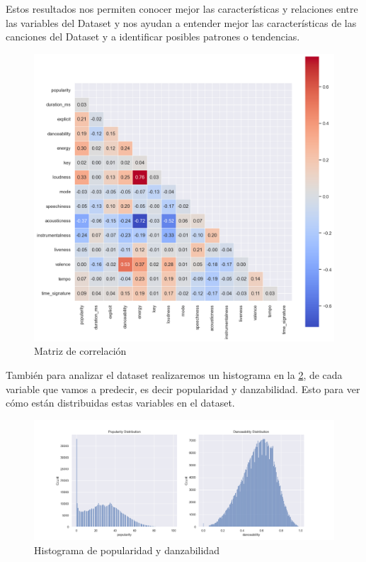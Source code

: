 \documentclass{wsdcr}
\begin{document}
Estos resultados nos permiten conocer mejor las características y relaciones entre las variables del Dataset y nos ayudan a entender mejor las características de las canciones del Dataset y a identificar posibles patrones o tendencias.

\begin{figure}[h!] \includegraphics[width=\columnwidth]{images/matriz_correlacion.png} \caption{Matriz de correlación} \label{fig:matriz_correlaccion} \end{figure}

También para analizar el dataset realizaremos un histograma en la \figurename{\ref*{fig:histogramas}}, de cada variable que vamos a predecir, es decir popularidad y danzabilidad. Esto para ver cómo están distribuidas estas variables en el dataset.


\begin{figure}[h!] \includegraphics[width=\columnwidth]{images/histogramas.png} \caption{Histograma de popularidad y danzabilidad} \label{fig:histogramas} \end{figure}
\end{document}
